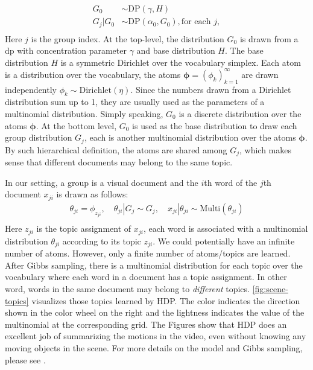 \begin{equation}    \label{eq:hdp}
\begin{aligned}    
    G_0 & \sim \text{DP}(\gamma, H) \\
    G_j|G_0 & \sim \text{DP}(\alpha_0, G_0), \text{for each } j,\\
\end{aligned}
\end{equation}
Here $j$ is the group index. At the top-level, the distribution $G_0$ is drawn from a \gls{dp} with concentration parameter $\gamma$ and base distribution $H$. 
The base distribution $H$ is a symmetric Dirichlet over the vocabulary simplex. 
Each atom is a distribution over the vocabulary, the atoms $\bm{\phi}=(\phi_k)^{\infty}_{k=1}$ are drawn independently $\phi_k \sim\text{Dirichlet}(\eta)$. Since the numbers drawn from a Dirichlet distribution sum up to 1, they are usually used as the parameters of a multinomial distribution. 
Simply speaking, $G_0$ is a discrete distribution over the atoms $\bm{\phi}$. 
At the bottom level, $G_0$ is used as the base distribution to draw each group distribution $G_j$, each is another multinomial distribution over the atoms $\bm{\phi}$. 
By such hierarchical definition, the atoms are shared among $G_j$, which makes sense that different documents may belong to the same topic.

In our setting, a group is a visual document and the $i$th word of the $j$th document $x_{ji}$ is drawn as follows:
\begin{equation}    \label{eq:multinomial}
\begin{aligned}
    \theta_{ji} = \phi_{z_{ji}}, \quad \theta_{ji}|G_j \sim G_j, \quad
    x_{ji}|\theta_{ji} \sim \text{Multi}(\theta_{ji})\\
\end{aligned}
\end{equation}
Here $z_{ji}$ is the topic assignment of $x_{ji}$, each word is associated with a multinomial distribution $\theta_{ji}$ according to its topic $z_{ji}$. 
We could potentially have an infinite number of atoms. However, only a finite number of atoms/topics are learned. 
After Gibbs sampling, there is a multinomial distribution for each topic over the vocabulary where each word in a document has a topic assignment. 
In other word, words in the same document may belong to  \emph{different} topics. \ref{fig:scene-topics} visualizes those topics learned by HDP. 
The color indicates the direction shown in the color wheel on the right and the lightness indicates the value of the multinomial at the corresponding grid. 
The Figures show that HDP does an excellent job of summarizing the motions in the video, even without knowing any moving objects in the scene. 
For more details on the model and Gibbs sampling, please see \cite{yee2006hierarchical}. 


